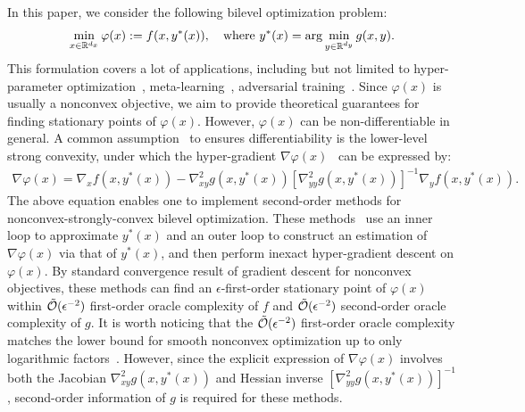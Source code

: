 \documentclass{article}
\begin{document}
In this paper, we consider the following bilevel optimization problem:
\begin{align} \label{hyper-refo}
    \min_{x \in {\mathbb{R}}^{d_x}} \varphi(x) := f(x,y^*(x)) , \quad {\rm where}~ y^*(x) = \arg \min_{y \in {\mathbb{R}}^{d_y}} g(x,y).
\end{align}
This formulation covers a lot of applications, including but not limited to hyper-parameter optimization~\cite{franceschi2018bilevel,pedregosa2016hyperparameter,gao2022value,zhou2022model}, meta-learning~\cite{finn2017model,nichol2018first,andrychowicz2016learning}, adversarial training~\cite{zhang2022revisiting,bruckner2011stackelberg,wang2021fast,bishop2020optimal}.
Since $\varphi(x)$ is usually a nonconvex objective, we aim to provide theoretical guarantees for finding stationary points of $\varphi(x)$. However, $\varphi(x)$ can be non-differentiable in general.
A common assumption~\cite{dagreou2022framework,ji2021bilevel,yang2021provably,ji2022will,ji2021lower,chen2021closing,khanduri2021near,hong2023two} to ensures differentiability is the lower-level strong convexity, under which the hyper-gradient $\nabla \varphi(x)$~\cite{ji2021bilevel,ghadimi2018approximation,pedregosa2016hyperparameter,grazzi2020iteration} can be expressed by:
\begin{align} \label{hyper-grad} 
    \nabla \varphi(x) = \nabla_x f(x,y^*(x)) - \nabla_{xy}^2 g(x,y^*(x)) [ \nabla_{yy}^2 g(x,y^*(x))]^{-1} \nabla_y f(x,y^*(x)).
\end{align}
The above equation enables one to implement
second-order methods for nonconvex-strongly-convex bilevel optimization. These methods~\cite{ji2021bilevel,yang2021provably,ji2022will,ji2021lower} use an inner loop to approximate $y^*(x)$ and an outer loop to 
construct an estimation of $\nabla \varphi(x)$ via that of $y^*(x)$, and then
perform inexact hyper-gradient descent on $\varphi(x)$. 
By standard convergence result of gradient descent for nonconvex objectives, these methods can find an $\epsilon$-first-order stationary point of $\varphi(x)$ within $\tilde {{\mathcal{O}}}(\epsilon^{-2})$ first-order oracle complexity of $f$ and $\tilde {{\mathcal{O}}}(\epsilon^{-2})$ second-order oracle complexity of $g$. It is worth noticing that the $\tilde {{\mathcal{O}}}(\epsilon^{-2})$ first-order oracle complexity matches the lower bound for smooth nonconvex optimization up to only logarithmic factors~\cite{carmon2020lower}.
However, since the explicit expression of $\nabla \varphi(x)$ involves both the Jacobian $\nabla_{xy}^2 g(x,y^*(x))$ and Hessian inverse $[\nabla_{yy}^2 g(x,y^*(x))]^{-1} $,
second-order information of $g$ is required for these methods. 
\end{document}
